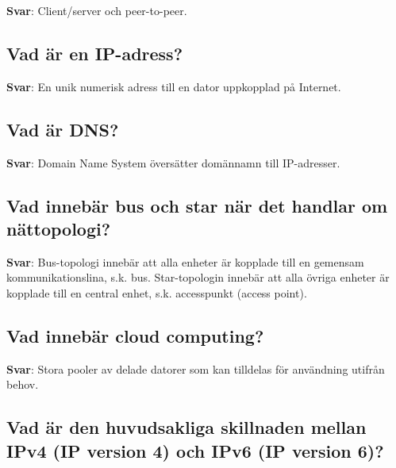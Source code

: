 \documentclass[a4paper,11pt,oneside]{article}
\begin{document}
\begin{sloppypar}
\label{q:135:sa:sv:True}

\textbf{Svar}: Client/server och peer-to-peer.



\subsection{Vad \"ar en IP-adress?}

\label{q:136:sa:sv:True}

\textbf{Svar}: En unik numerisk adress till en dator uppkopplad p\r{a} Internet.



\subsection{Vad \"ar DNS?}

\label{q:137:sa:sv:True}

\textbf{Svar}: Domain Name System \"overs\"atter dom\"annamn till IP-adresser.



\subsection{Vad inneb\"ar bus och star n\"ar det handlar om n\"attopologi?}

\label{q:138:sa:sv:True}

\textbf{Svar}: Bus-topologi inneb\"ar att alla enheter \"ar kopplade till en gemensam kommunikationslina, s.k. bus. Star-topologin inneb\"ar att alla \"ovriga enheter \"ar kopplade till en central enhet, s.k. accesspunkt (access point).



\subsection{Vad inneb\"ar cloud computing?}

\label{q:139:sa:sv:True}

\textbf{Svar}: Stora pooler av delade datorer som kan tilldelas f\"or anv\"andning utifr\r{a}n behov.



\subsection{Vad \"ar den huvudsakliga skillnaden mellan IPv4 (IP version 4) och IPv6 (IP version 6)?}

\label{q:140:sa:sv:True}


\end{sloppypar}
\end{document}
